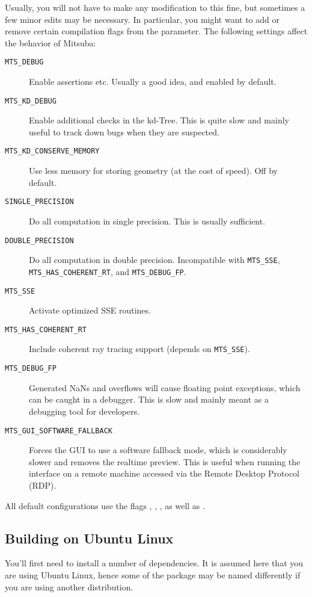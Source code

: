 Usually, you will not have to make any modification to this fine, but sometimes a few minor 
edits may be necessary. In particular, you might want to add or remove certain
compilation flags from the  parameter. The following settings
affect the behavior of Mitsuba:
\begin{description}
\item[\texttt{MTS\_DEBUG}] Enable assertions etc. Usually a good idea, and
enabled by default.
\item[\texttt{MTS\_KD\_DEBUG}] Enable additional checks in the kd-Tree. This
is quite slow and mainly useful to track down bugs when they are suspected.
\item[\texttt{MTS\_KD\_CONSERVE\_MEMORY}] Use less memory for storing geometry (at the cost of speed).
Off by default.
\item[\texttt{SINGLE\_PRECISION}] Do all computation in single precision. This is usually sufficient.
\item[\texttt{DOUBLE\_PRECISION}] Do all computation in double precision. Incompatible with
\texttt{MTS\_SSE}, \texttt{MTS\_HAS\_COHERENT\_RT}, and \texttt{MTS\_DEBUG\_FP}.
\item[\texttt{MTS\_SSE}]Activate optimized SSE routines.
\item[\texttt{MTS\_HAS\_COHERENT\_RT}]Include coherent ray tracing support (depends on \texttt{MTS\_SSE}).
\item[\texttt{MTS\_DEBUG\_FP}]Generated NaNs and overflows will cause floating point exceptions, which can be caught in a debugger. This is slow and mainly meant as a debugging tool for developers.
\item[\texttt{MTS\_GUI\_SOFTWARE\_FALLBACK}]Forces the GUI to use a software
fallback mode, which is considerably slower and removes the realtime preview.
This is useful when running the interface on a remote machine
accessed via the Remote Desktop Protocol (RDP).
\end{description}
All default configurations use the flags , , ,
as well as .

\subsection{Building on Ubuntu Linux}
You'll first need to install a number of dependencies. It is assumed here
that you are using Ubuntu Linux, hence some of the package may be named differently if you are 
using another distribution.

